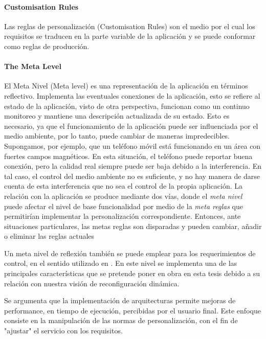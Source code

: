 \paragraph{Customisation Rules}

Las reglas de personalización (Customisation Rules) son el medio por el cual los requisitos se traducen en la parte variable de la aplicación y se puede conformar como reglas de producción.


\paragraph{The Meta Level}

El Meta Nivel (Meta level) es una representación de la aplicación en términos reflectivo. Implementa las eventuales conexiones de la aplicación, esto se refiere al estado de la aplicación, visto de otra perspectiva, funcionan como
un continuo monitoreo y mantiene una descripción actualizada de su estado. Esto es necesario, ya que el funcionamiento de la aplicación puede ser influenciada por el medio ambiente, por lo tanto, puede cambiar de maneras impredecibles. Supongamos, por ejemplo, que un teléfono móvil está funcionando en un área con fuertes campos magnéticos. En esta situación, el teléfono puede reportar buena conexión, pero la calidad real siempre puede ser baja debido a la interferencia. En tal caso, el control del medio ambiente no es suficiente, y no hay manera de darse cuenta de esta interferencia que no sea el control de la propia aplicación. La relación con la aplicación se produce mediante dos vías, donde el \textit{meta nivel } puede afectar el nivel de base funcionalidad por medio de la \textit{meta reglas} que permitirían implementar la personalización correspondiente. Entonces, ante situaciones particulares, las metas reglas son disparadas y pueden cambiar, añadir o eliminar las reglas actuales

Un meta nivel de reflexión también se puede emplear para los requerimientos de control, en el sentido utilizado en \cite{UWA5}. En este nivel se implementa una de las principales características que se pretende poner en obra en esta tesis debido a su relación con nuestra visión de reconfiguración dinámica. 

Se argumenta que la implementación de arquitecturas permite mejoras de performance, en tiempo de ejecución, percibidas por el usuario final. Este enfoque consiste en la manipulación de las normas de personalización, con el fin de "ajustar" el servicio con los requisitos. 



